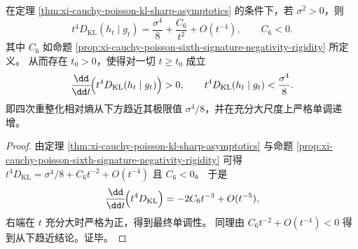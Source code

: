 \begin{corollary}[四次重整化相对熵的最终单调趋近]\label{cor:xi-cauchy-poisson-kl-renormalized-monotone-approach}
在定理 \ref{thm:xi-cauchy-poisson-kl-sharp-asymptotics} 的条件下，若 \(\sigma^2>0\)，则
\[
t^4D_{\mathrm{KL}}(h_t\mid g_t)
=\frac{\sigma^4}{8}+\frac{C_6}{t^2}+O(t^{-4}),
\qquad
C_6<0.
\]
其中 \(C_6\) 如命题 \ref{prop:xi-cauchy-poisson-sixth-signature-negativity-rigidity} 所定义。
从而存在 \(t_0>0\)，使得对一切 \(t\ge t_0\) 成立
\[
\frac{\dd}{\dd t}\!\Bigl(t^4D_{\mathrm{KL}}(h_t\mid g_t)\Bigr)>0,
\qquad
t^4D_{\mathrm{KL}}(h_t\mid g_t)<\frac{\sigma^4}{8}.
\]
即四次重整化相对熵从下方趋近其极限值 \(\sigma^4/8\)，并在充分大尺度上严格单调递增。
\end{corollary}
\begin{proof}
由定理 \ref{thm:xi-cauchy-poisson-kl-sharp-asymptotics} 与命题 \ref{prop:xi-cauchy-poisson-sixth-signature-negativity-rigidity} 可得
\(
t^4D_{\mathrm{KL}}=\sigma^4/8+C_6t^{-2}+O(t^{-4})
\)
且 \(C_6<0\)。
于是
\[
\frac{\dd}{\dd t}\!\Bigl(t^4D_{\mathrm{KL}}\Bigr)
=-2C_6t^{-3}+O(t^{-5}),
\]
右端在 \(t\) 充分大时严格为正，得到最终单调性。
同理由 \(C_6t^{-2}+O(t^{-4})<0\) 得到从下趋近结论。证毕。
\end{proof}

